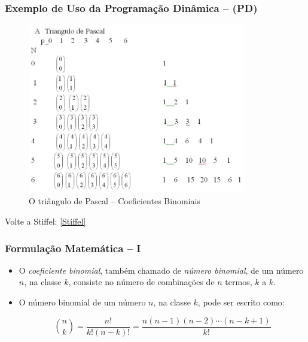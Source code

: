 \begin{frame}[fragile]

\frametitle{Exemplo de Uso da Programação Dinâmica -- (PD)}

\label{Triangulo_Pascal}

\begin{figure}[!htb]
\centering
\includegraphics[width=0.850\textwidth, height=0.650\textheight]{figures/pascal_triangle_02.jpg}
\caption{O triângulo de Pascal -- Coeficientes Binomiais}
\end{figure}
Volte a Stiffel: \ref{Stiffel}    
    
\end{frame}


\begin{frame}[fragile]

\frametitle{Formulação Matemática -- I}

\begin{itemize}
  \item O \textit{coeficiente binomial}, também chamado de \textit{número binomial}, 
de um número $n$, na classe $k$, consiste no número de combinações de $n$ termos, $k$ a $k$. 

\pause
  \item O número binomial de um número $n$, na classe $k$, pode ser escrito como:

$$ {n \choose k}= \frac {n!}{k!(n-k)!}=\frac {n(n-1)(n-2)\cdots(n-k+1)}{k!}$$
\end{itemize}   
    
\end{frame}



